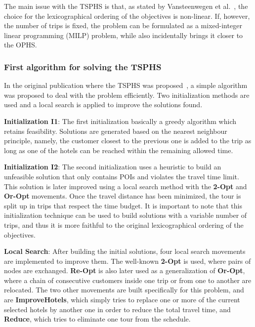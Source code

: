     The main issue with the TSPHS is that, as stated by Vansteenwegen et al.~\cite{vansteenwegen2012}, the choice for the lexicographical ordering of the objectives is non-linear. If, however, the number of trips is fixed, the problem can be formulated as a mixed-integer linear programming (MILP) problem, while also incidentally brings it closer to the OPHS.

\subsubsection{First algorithm for solving the TSPHS}

    In the original publication where the TSPHS was proposed~\cite{vansteenwegen2012}, a simple algorithm was proposed to deal with the problem efficiently. Two initialization methods are used and a local search is applied to improve the solutions found.

    \textbf{Initialization I1}: The first initialization basically a greedy algorithm which retains feasibility. Solutions are generated based on the nearest neighbour principle, namely, the customer closest to the previous one is added to the trip as long as one of the hotels can be reached within the remaining allowed time.

    \textbf{Initialization I2}: The second initialization uses a heuristic to build an unfeasible solution that only contains POIs and violates the travel time limit. This solution is later improved using a local search method with the \textbf{2-Opt} and \textbf{Or-Opt} movements. Once the travel distance has been minimized, the tour is split up in trips that respect the time budget. It is important to note that this initialization technique can be used to build solutions with a variable number of trips, and thus it is more faithful to the original lexicographical ordering of the objectives.
    
    \textbf{Local Search}: After building the initial solutions, four local search movements are implemented to improve them. The well-known \textbf{2-Opt} is used, where pairs of nodes are exchanged. \textbf{Re-Opt} is also later used as a generalization of \textbf{Or-Opt}, where a chain of consecutive customers inside one trip or from one to another are relocated. The two other movements are built specifically for this problem, and are \textbf{ImproveHotels}, which simply tries to replace one or more of the current selected hotels by another one in order to reduce the total travel time, and \textbf{Reduce}, which tries to eliminate one tour from the schedule.
    
